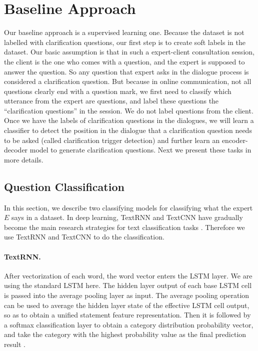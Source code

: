 \section{Baseline Approach}
\label{method}
Our baseline approach is a supervised learning one.
Because the dataset is not labelled with clarification questions, our first step is to create soft 
labels in the dataset. Our basic assumption is that in such a expert-client consultation session, 
the client is the one who comes with a question, and the expert is supposed to answer the question. 
So any question that expert asks in the dialogue process is considered a clarification question. 
But because in online communication, not all questions clearly end with a question mark, 
we first need to classify which utterance from the expert are questions, and label these questions the 
``clarification questions'' in the session.  We do not label questions from the client. 
Once we have the labels of clarification questions in the dialogues,
we will learn a classifier to detect the position in the dialogue that a clarification question needs to be asked (called clarification trigger detection) and further learn an encoder-decoder model to generate clarification questions.
Next we present these tasks in more details.

\subsection{Question Classification}
\label{sec:qn}
In this section, we describe two classifying models for classifying what the expert $E$ says in a dataset. In deep learning, TextRNN and TextCNN have gradually become the main research strategies for text classification tasks \cite{DBLP:journals/access/ChengCGPZ20}. Therefore we use TextRNN and TextCNN to do the classification.

\paragraph{TextRNN.} 
After vectorization of each word, the word vector enters the LSTM layer. We are using the standard LSTM here. The hidden layer output of each base LSTM cell is passed into the average pooling layer as input. The average pooling operation can be used to average the hidden layer state of the effective LSTM cell output, so as to obtain a unified statement feature representation. Then it is followed by a softmax classification layer to obtain a category distribution probability vector, and take the category with the highest probability value as the final prediction result \cite{DBLP:conf/aaai/LaiXLZ15}.


